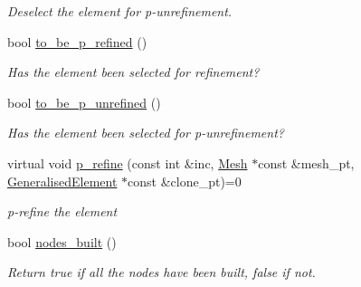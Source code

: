 \begin{DoxyCompactItemize}
\begin{DoxyCompactList}\small\item\em Deselect the element for p-\/unrefinement. \end{DoxyCompactList}\item 
bool \hyperlink{classoomph_1_1PRefineableElement_a988945bf2c1eef6c406033e506705cf7}{to\+\_\+be\+\_\+p\+\_\+refined} ()
\begin{DoxyCompactList}\small\item\em Has the element been selected for refinement? \end{DoxyCompactList}\item 
bool \hyperlink{classoomph_1_1PRefineableElement_a0060b4224c7db8c950448f736a1ce597}{to\+\_\+be\+\_\+p\+\_\+unrefined} ()
\begin{DoxyCompactList}\small\item\em Has the element been selected for p-\/unrefinement? \end{DoxyCompactList}\item 
virtual void \hyperlink{classoomph_1_1PRefineableElement_a706db9352965197a215405f620b3cedc}{p\+\_\+refine} (const int \&inc, \hyperlink{classoomph_1_1Mesh}{Mesh} $\ast$const \&mesh\+\_\+pt, \hyperlink{classoomph_1_1GeneralisedElement}{Generalised\+Element} $\ast$const \&clone\+\_\+pt)=0
\begin{DoxyCompactList}\small\item\em p-\/refine the element \end{DoxyCompactList}\item 
bool \hyperlink{classoomph_1_1PRefineableElement_a18a6ec4187845d2dbad763ba284ffcc2}{nodes\+\_\+built} ()
\begin{DoxyCompactList}\small\item\em Return true if all the nodes have been built, false if not. \end{DoxyCompactList}\end{DoxyCompactItemize}
